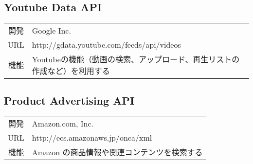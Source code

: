 \subsection{Youtube Data API}
\begin{tabular}{c|l}
開発 & Google Inc.\\
URL & http://gdata.youtube.com/feeds/api/videos\\
機能 & Youtubeの機能（動画の検索、アップロード、再生リストの作成など）を利用する
\end{tabular}
\subsection{Product Advertising API}
\begin{tabular}{c|l}
開発 & Amazon.com, Inc.\\
URL & http://ecs.amazonaws.jp/onca/xml\\
機能 & Amazon の商品情報や関連コンテンツを検索する
\end{tabular}